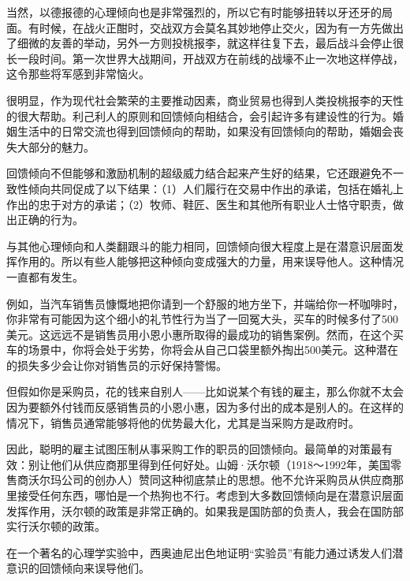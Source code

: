 当然，以德报德的心理倾向也是非常强烈的，所以它有时能够扭转以牙还牙的局面。有时候，在战火正酣时，交战双方会莫名其妙地停止交火，因为有一方先做出了细微的友善的举动，另外一方则投桃报李，就这样往复下去，最后战斗会停止很长一段时间。第一次世界大战期间，开战双方在前线的战壕不止一次地这样停战，这令那些将军感到非常恼火。
\par

很明显，作为现代社会繁荣的主要推动因素，商业贸易也得到人类投桃报李的天性的很大帮助。利己利人的原则和回馈倾向相结合，会引起许多有建设性的行为。婚姻生活中的日常交流也得到回馈倾向的帮助，如果没有回馈倾向的帮助，婚姻会丧失大部分的魅力。
\par

回馈倾向不但能够和激励机制的超级威力结合起来产生好的结果，它还跟避免不一致性倾向共同促成了以下结果：（1）人们履行在交易中作出的承诺，包括在婚礼上作出的忠于对方的承诺；（2）牧师、鞋匠、医生和其他所有职业人士恪守职责，做出正确的行为。
\par

与其他心理倾向和人类翻跟斗的能力相同，回馈倾向很大程度上是在潜意识层面发挥作用的。所以有些人能够把这种倾向变成强大的力量，用来误导他人。这种情况一直都有发生。
\par

例如，当汽车销售员慷慨地把你请到一个舒服的地方坐下，并端给你一杯咖啡时，你非常有可能因为这个细小的礼节性行为当了一回冤大头，买车的时候多付了500美元。这远远不是销售员用小恩小惠所取得的最成功的销售案例。然而，在这个买车的场景中，你将会处于劣势，你将会从自己口袋里额外掏出500美元。这种潜在的损失多少会让你对销售员的示好保持警惕。
\par

但假如你是采购员，花的钱来自别人——比如说某个有钱的雇主，那么你就不太会因为要额外付钱而反感销售员的小恩小惠，因为多付出的成本是别人的。在这样的情况下，销售员通常能够将他的优势最大化，尤其是当采购方是政府时。
\par

因此，聪明的雇主试图压制从事采购工作的职员的回馈倾向。最简单的对策最有效：别让他们从供应商那里得到任何好处。山姆·沃尔顿（1918～1992年，美国零售商沃尔玛公司的创办人）赞同这种彻底禁止的思想。他不允许采购员从供应商那里接受任何东西，哪怕是一个热狗也不行。考虑到大多数回馈倾向是在潜意识层面发挥作用，沃尔顿的政策是非常正确的。如果我是国防部的负责人，我会在国防部实行沃尔顿的政策。
\par

在一个著名的心理学实验中，西奥迪尼出色地证明“实验员”有能力通过诱发人们潜意识的回馈倾向来误导他们。
\par

